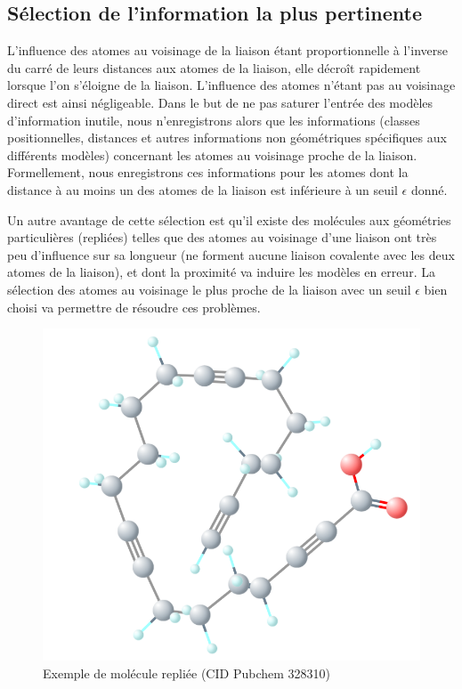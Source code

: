 \subsection{Sélection de l'information la plus pertinente}
\par L'influence des atomes au voisinage de la liaison étant proportionnelle à l'inverse du carré de leurs distances aux atomes de la liaison, elle décroît rapidement lorsque l'on s'éloigne de la liaison. L'influence des atomes n'étant pas au voisinage direct est ainsi négligeable. Dans le but de ne pas saturer l'entrée des modèles d'information inutile, nous n'enregistrons alors que les informations (classes positionnelles, distances et autres informations non géométriques spécifiques aux différents modèles) concernant les atomes au voisinage proche de la liaison. Formellement, nous enregistrons ces informations pour les atomes dont la distance à au moins un des atomes de la liaison est inférieure à un seuil $\epsilon$  donné.\\

\par Un autre avantage de cette sélection est qu'il existe des molécules aux géométries particulières (repliées) telles que des atomes au voisinage d'une liaison ont très peu d'influence sur sa longueur (ne forment aucune liaison covalente avec les deux atomes de la liaison), et dont la proximité va induire les modèles en erreur. La sélection des atomes au voisinage le plus proche de la liaison avec un seuil $\epsilon$ bien choisi va permettre de résoudre ces problèmes.

\begin{figure}[!h]
	\centering
	
	\includegraphics[scale=0.25]{images/mol_repliee.png}
	\caption{Exemple de molécule repliée (CID Pubchem 328310)}
\end{figure}